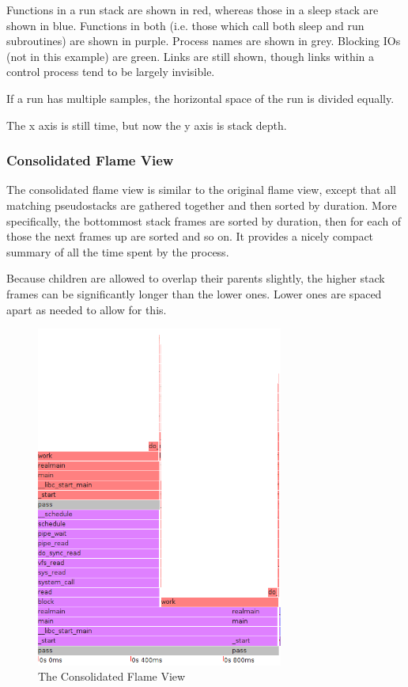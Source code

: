 \documentclass[10pt]{article}
\begin{document}
Functions in a run stack are shown in red, whereas those in a sleep stack are shown in blue.  Functions in both (i.e. those which call both sleep and run subroutines) are shown in purple. Process names are shown in grey.  Blocking IOs (not in this example) are green.  Links are still shown, though links within a control process tend to be largely invisible.

If a run has multiple samples, the horizontal space of the run is divided equally.

The x axis is still time, but now the y axis is stack depth.

\subsubsection{Consolidated Flame View}

The consolidated flame view is similar to the original flame view, except that all matching pseudostacks are gathered together and then sorted by duration.  More specifically, the bottommost stack frames are sorted by duration, then for each of those the next frames up are sorted and so on.  It provides a nicely compact summary of all the time spent by the process.

Because children are allowed to overlap their parents slightly, the higher stack frames can be significantly longer than the lower ones.  Lower ones are spaced apart as needed to allow for this.

\begin{figure}[h!]
\includegraphics[width=3.2in]{images/passcons}
\caption{The Consolidated Flame View}
\end{figure}
\end{document}
